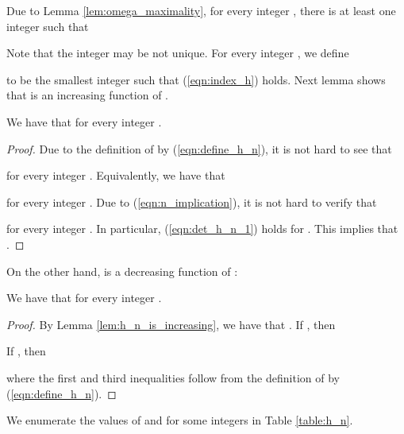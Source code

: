 \documentclass[JMC]{degruyter-journal}
\begin{document}
Due to Lemma  \ref{lem:omega_maximality}, for every integer , there is at least one integer  such that

Note that the integer  may be not unique. For every integer
, we define

to be the smallest integer  such that
(\ref{eqn:index_h}) holds.
 Next lemma shows that  is an increasing  function of .
\begin{lemma}\label{lem:h_n_is_increasing}
We have that  for every  integer .
\end{lemma}
\begin{proof}
Due to the definition of  by
(\ref{eqn:define_h_n}), it is not hard to see that

 for every
integer . Equivalently, we have that

for every integer . Due to 
(\ref{eqn:n_implication}), it is not hard to verify that

for every integer . In particular, 
(\ref{eqn:det_h_n_1}) holds for . This implies that .
\end{proof}

On the other hand,  is a decreasing function of :
\begin{lemma}\label{lem:omega_n_is_decreasing}
We have that  for every  integer
.
\end{lemma}
\begin{proof}
By Lemma \ref{lem:h_n_is_increasing}, we have that  .  If , then

If , then

where the first and third inequalities follow from the
definition of    by 
(\ref{eqn:define_h_n}).
\end{proof}













We enumerate  the values of  and  for some integers   in Table \ref{table:h_n}.
\end{document}
